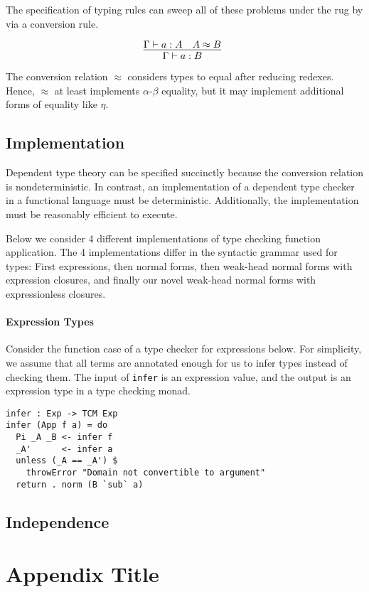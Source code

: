 \documentclass[preprint,authoryear]{sigplanconf}
\def\turn{\vdash}
\def\conv{\approx}
\begin{document}
The specification of typing rules can sweep all of these
problems under the rug by via a conversion rule.

$$
\infer[]
  {\Gamma \turn a : B}
{
  \Gamma \turn a : A
  &
  A \conv B
}
$$

The conversion relation $\conv$ considers types to equal after
reducing redexes. Hence, $\conv$ at least implements $\alpha$-$\beta$
equality, but it may implement additional forms of equality like $\eta$.

\subsection{Implementation}

Dependent type theory can be specified succinctly because the
conversion relation is nondeterministic. In contrast, an
implementation of a dependent type checker in a functional language
must be deterministic. Additionally, the implementation must be
reasonably efficient to execute. 

Below we consider 4 different implementations of type checking
function application. The 4 implementations differ in the syntactic
grammar used for types: First expressions, then normal forms, then
weak-head normal forms with expression closures, and finally our novel
weak-head normal forms with expressionless closures.

\paragraph{Expression Types}

Consider the function case of a type checker for expressions below.
For simplicity, we assume that all terms are annotated enough for us
to infer types instead of checking them. The input of \texttt{infer} is an expression
value, and the output is an expression type in a type checking monad.

\begin{verbatim}
infer : Exp -> TCM Exp
infer (App f a) = do
  Pi _A _B <- infer f
  _A'      <- infer a
  unless (_A == _A') $
    throwError "Domain not convertible to argument"
  return . norm (B `sub` a)
\end{verbatim}


\subsection{Independence}

\appendix
\section{Appendix Title}
\end{document}
